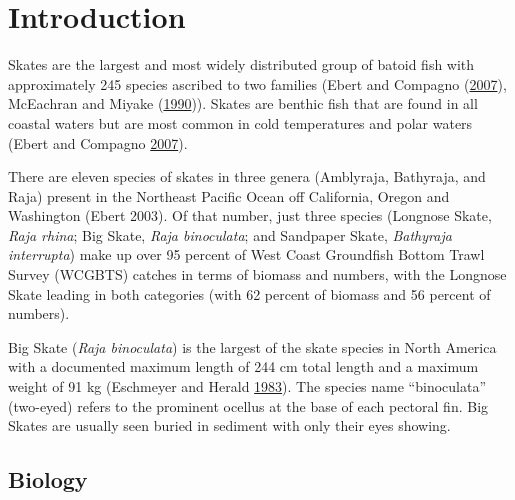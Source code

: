 \documentclass[12pt,]{article}
\begin{document}
\FloatBarrier

\newpage
\renewcommand{\thefigure}{\arabic{figure}}
\renewcommand{\thetable}{\arabic{table}}
\setcounter{figure}{0}
\setcounter{table}{0}

\newpage
\renewcommand{\thefigure}{\arabic{figure}}
\renewcommand{\thetable}{\arabic{table}}
\setcounter{figure}{0}
\setcounter{table}{0}

\hypertarget{introduction}{%
\section{Introduction}\label{introduction}}

Skates are the largest and most widely distributed group of batoid fish
with approximately 245 species ascribed to two families (Ebert and
Compagno (\protect\hyperlink{ref-Ebert2007}{2007}), McEachran and Miyake
(\protect\hyperlink{ref-McEachran1990}{1990})). Skates are benthic fish
that are found in all coastal waters but are most common in cold
temperatures and polar waters (Ebert and Compagno
\protect\hyperlink{ref-Ebert2007}{2007}).

There are eleven species of skates in three genera (Amblyraja,
Bathyraja, and Raja) present in the Northeast Pacific Ocean off
California, Oregon and Washington (Ebert 2003). Of that number, just
three species (Longnose Skate, \emph{Raja rhina}; Big Skate, \emph{Raja
binoculata}; and Sandpaper Skate, \emph{Bathyraja interrupta}) make up
over 95 percent of West Coast Groundfish Bottom Trawl Survey (WCGBTS)
catches in terms of biomass and numbers, with the Longnose Skate leading
in both categories (with 62 percent of biomass and 56 percent of
numbers).

Big Skate (\emph{Raja binoculata}) is the largest of the skate species
in North America with a documented maximum length of 244 cm total length
and a maximum weight of 91 kg (Eschmeyer and Herald
\protect\hyperlink{ref-Eschmeyer1983}{1983}). The species name
``binoculata'' (two-eyed) refers to the prominent ocellus at the base of
each pectoral fin. Big Skates are usually seen buried in sediment with
only their eyes showing.

\hypertarget{biology}{%
\subsection{Biology}\label{biology}}
\end{document}
